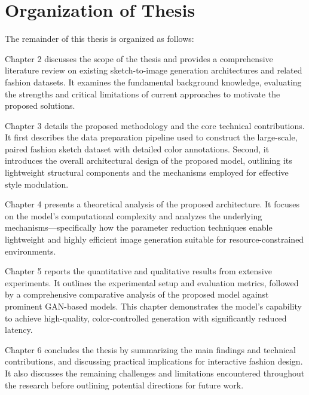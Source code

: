 \documentclass[../main.tex]{subfiles}
\begin{document}
\section{Organization of Thesis}
\label{sec:organization}
The remainder of this thesis is organized as follows:

Chapter 2 discusses the scope of the thesis and  provides a comprehensive literature review on existing sketch-to-image generation architectures and related fashion datasets. It examines the fundamental background knowledge, evaluating the strengths and critical limitations of current approaches to motivate the proposed solutions.

Chapter 3 details the proposed methodology and the core technical contributions. It first describes the data preparation pipeline used to construct the large-scale, paired fashion sketch dataset with detailed color annotations. Second, it introduces the overall architectural design of the proposed model, outlining its lightweight structural components and the mechanisms employed for effective style modulation.

Chapter 4 presents a theoretical analysis of the proposed architecture. It focuses on the model's computational complexity and analyzes the underlying mechanisms—specifically how the parameter reduction techniques enable lightweight and highly efficient image generation suitable for resource-constrained environments.

Chapter 5 reports the quantitative and qualitative results from extensive experiments. It outlines the experimental setup and evaluation metrics, followed by a comprehensive comparative analysis of the proposed model against prominent GAN-based models. This chapter demonstrates the model's capability to achieve high-quality, color-controlled generation with significantly reduced latency.

Chapter 6 concludes the thesis by summarizing the main findings and technical contributions, and discussing practical implications for interactive fashion design. It also discusses the remaining challenges and limitations encountered throughout the research before outlining potential directions for future work.
\end{document}
